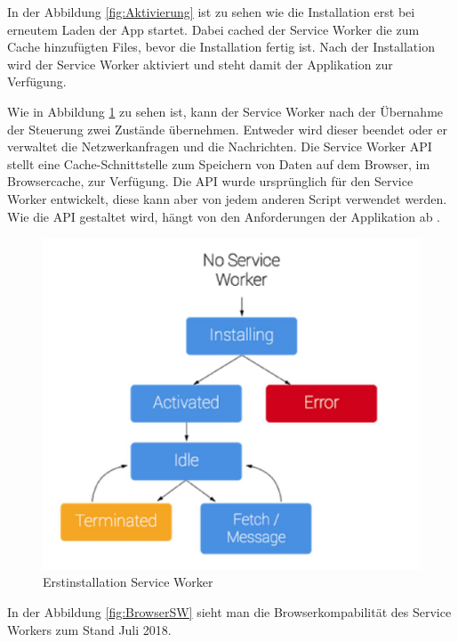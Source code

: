 In der Abbildung \ref{fig:Aktivierung} ist zu sehen wie die Installation erst bei erneutem Laden der App startet. Dabei cached der Service Worker die zum Cache hinzufügten Files, bevor die Installation fertig ist.
Nach der Installation wird der Service Worker aktiviert und steht damit der Applikation zur Verfügung.


Wie in Abbildung \ref{fig:Erstinstallation} zu sehen ist, kann der Service Worker nach der Übernahme der Steuerung zwei Zustände übernehmen. Entweder wird dieser beendet oder er verwaltet die Netzwerkanfragen und die Nachrichten.
Die Service Worker API stellt eine Cache-Schnittstelle zum Speichern von Daten auf dem Browser, im Browsercache, zur Verfügung. Die API wurde ursprünglich für den Service Worker entwickelt, diese kann aber von jedem anderen Script verwendet werden. 
Wie die API gestaltet wird, hängt von den Anforderungen der Applikation ab \cite{ServiceWorkerRegistration}.


\begin{figure}[H]
	\centering
	\includegraphics[width=12cm]{BilderAllgemein/InstallSW}\medskip
	\caption{Erstinstallation Service Worker \cite{ServiceWorkerRegistration}}
	\label{fig:Erstinstallation}
\end{figure}


In der Abbildung \ref{fig:BrowserSW} sieht man die Browserkompabilität des Service Workers zum Stand Juli 2018.




